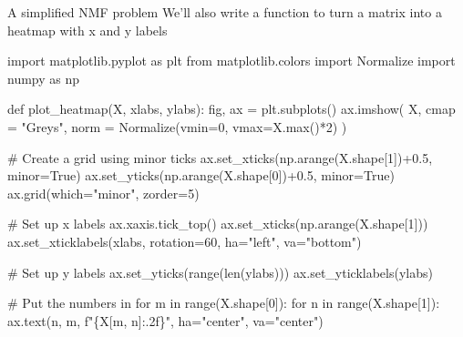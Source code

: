 \documentclass[
  10pt,
  ignorenonframetext,
  aspectratio=169]{beamer}
\newenvironment{Shaded}{\begin{snugshade}}{\end{snugshade}}
\newcommand{\BuiltInTok}[1]{\textcolor[rgb]{0.80,0.80,0.80}{#1}}
\newcommand{\CommentTok}[1]{\textcolor[rgb]{0.50,0.62,0.50}{#1}}
\newcommand{\ControlFlowTok}[1]{\textcolor[rgb]{0.94,0.87,0.69}{#1}}
\newcommand{\DecValTok}[1]{\textcolor[rgb]{0.86,0.86,0.80}{#1}}
\newcommand{\FloatTok}[1]{\textcolor[rgb]{0.75,0.75,0.82}{#1}}
\newcommand{\ImportTok}[1]{\textcolor[rgb]{0.80,0.80,0.80}{#1}}
\newcommand{\KeywordTok}[1]{\textcolor[rgb]{0.94,0.87,0.69}{#1}}
\newcommand{\NormalTok}[1]{\textcolor[rgb]{0.80,0.80,0.80}{#1}}
\newcommand{\OperatorTok}[1]{\textcolor[rgb]{0.94,0.94,0.82}{#1}}
\newcommand{\SpecialCharTok}[1]{\textcolor[rgb]{0.86,0.64,0.64}{#1}}
\newcommand{\SpecialStringTok}[1]{\textcolor[rgb]{0.80,0.58,0.58}{#1}}
\newcommand{\StringTok}[1]{\textcolor[rgb]{0.80,0.58,0.58}{#1}}
\newcommand{\VariableTok}[1]{\textcolor[rgb]{0.80,0.80,0.80}{#1}}
\begin{document}
\begin{frame}[fragile]{A simplified NMF problem}
\protect\hypertarget{a-simplified-nmf-problem-1}{}
We'll also write a function to turn a matrix into a heatmap with x and y
labels

\medskip

\tiny

\begin{Shaded}
\begin{Highlighting}[]
\ImportTok{import}\NormalTok{ matplotlib.pyplot }\ImportTok{as}\NormalTok{ plt}
\ImportTok{from}\NormalTok{ matplotlib.colors }\ImportTok{import}\NormalTok{ Normalize}
\ImportTok{import}\NormalTok{ numpy }\ImportTok{as}\NormalTok{ np}

\KeywordTok{def}\NormalTok{ plot\_heatmap(X, xlabs, ylabs):}
\NormalTok{    fig, ax }\OperatorTok{=}\NormalTok{ plt.subplots()}
\NormalTok{    ax.imshow(}
\NormalTok{        X, cmap }\OperatorTok{=} \StringTok{"Greys"}\NormalTok{,}
\NormalTok{        norm }\OperatorTok{=}\NormalTok{ Normalize(vmin}\OperatorTok{=}\DecValTok{0}\NormalTok{, vmax}\OperatorTok{=}\NormalTok{X.}\BuiltInTok{max}\NormalTok{()}\OperatorTok{*}\DecValTok{2}\NormalTok{)}
\NormalTok{    )}

    \CommentTok{\# Create a grid using minor ticks}
\NormalTok{    ax.set\_xticks(np.arange(X.shape[}\DecValTok{1}\NormalTok{])}\OperatorTok{+}\FloatTok{0.5}\NormalTok{, minor}\OperatorTok{=}\VariableTok{True}\NormalTok{)}
\NormalTok{    ax.set\_yticks(np.arange(X.shape[}\DecValTok{0}\NormalTok{])}\OperatorTok{+}\FloatTok{0.5}\NormalTok{, minor}\OperatorTok{=}\VariableTok{True}\NormalTok{)}
\NormalTok{    ax.grid(which}\OperatorTok{=}\StringTok{"minor"}\NormalTok{, zorder}\OperatorTok{=}\DecValTok{5}\NormalTok{)}

    \CommentTok{\# Set up x labels}
\NormalTok{    ax.xaxis.tick\_top()}
\NormalTok{    ax.set\_xticks(np.arange(X.shape[}\DecValTok{1}\NormalTok{]))}
\NormalTok{    ax.set\_xticklabels(xlabs, rotation}\OperatorTok{=}\DecValTok{60}\NormalTok{, ha}\OperatorTok{=}\StringTok{"left"}\NormalTok{, va}\OperatorTok{=}\StringTok{"bottom"}\NormalTok{)}

    \CommentTok{\# Set up y labels}
\NormalTok{    ax.set\_yticks(}\BuiltInTok{range}\NormalTok{(}\BuiltInTok{len}\NormalTok{(ylabs)))}
\NormalTok{    ax.set\_yticklabels(ylabs)}

    \CommentTok{\# Put the numbers in}
    \ControlFlowTok{for}\NormalTok{ m }\KeywordTok{in} \BuiltInTok{range}\NormalTok{(X.shape[}\DecValTok{0}\NormalTok{]):}
        \ControlFlowTok{for}\NormalTok{ n }\KeywordTok{in} \BuiltInTok{range}\NormalTok{(X.shape[}\DecValTok{1}\NormalTok{]):}
\NormalTok{            ax.text(n, m, }\SpecialStringTok{f"}\SpecialCharTok{\{}\NormalTok{X[m, n]}\SpecialCharTok{:.2f\}}\SpecialStringTok{"}\NormalTok{, ha}\OperatorTok{=}\StringTok{"center"}\NormalTok{, va}\OperatorTok{=}\StringTok{"center"}\NormalTok{)}
\end{Highlighting}
\end{Shaded}
\end{frame}
\end{document}
